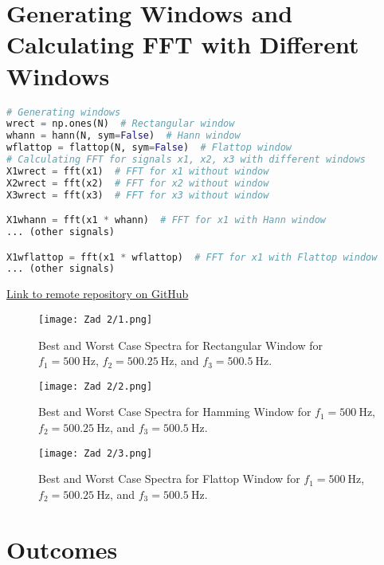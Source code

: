 \documentclass[12pt]{article}
\begin{document}
\section*{Generating Windows and Calculating FFT with Different Windows}
\begin{lstlisting}[language=Python, breaklines=true]
# Generating windows
wrect = np.ones(N)  # Rectangular window
whann = hann(N, sym=False)  # Hann window
wflattop = flattop(N, sym=False)  # Flattop window
# Calculating FFT for signals x1, x2, x3 with different windows
X1wrect = fft(x1)  # FFT for x1 without window
X2wrect = fft(x2)  # FFT for x2 without window
X3wrect = fft(x3)  # FFT for x3 without window

X1whann = fft(x1 * whann)  # FFT for x1 with Hann window
... (other signals)

X1wflattop = fft(x1 * wflattop)  # FFT for x1 with Flattop window
... (other signals)
\end{lstlisting}
\item \href{https://github.com/DariaKrecichwostQA/StudiaUBB/tree/main/Digital%20Signal%20Processing/Zad2}{{Link to remote repository on GitHub}}

\begin{figure}[htbp]
\centering
\texttt{[image: Zad 2/1.png]} 
\caption{Best and Worst Case Spectra for Rectangular Window for \(f_1 = 500 \ \text{Hz}\), \(f_2 = 500.25 \ \text{Hz}\), and \(f_3 = 500.5 \ \text{Hz}\).}
\label{fig:best_worst_case_rect}
\end{figure}

\begin{figure}[htbp]
\centering
\texttt{[image: Zad 2/2.png]} 
\caption{Best and Worst Case Spectra for Hamming Window for \(f_1 = 500 \ \text{Hz}\), \(f_2 = 500.25 \ \text{Hz}\), and \(f_3 = 500.5 \ \text{Hz}\).}
\label{fig:best_worst_case_hann}
\end{figure}

\begin{figure}[htbp]
\centering
\texttt{[image: Zad 2/3.png]} 
\caption{Best and Worst Case Spectra for Flattop Window for \(f_1 = 500 \ \text{Hz}\), \(f_2 = 500.25 \ \text{Hz}\), and \(f_3 = 500.5 \ \text{Hz}\).}
\label{fig:best_worst_case_flattop}
\end{figure}

\FloatBarrier
\section{Outcomes}
\end{document}
